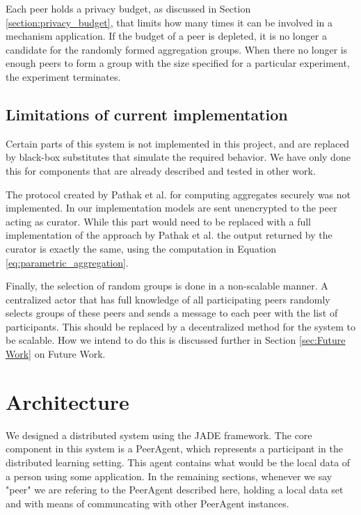 Each peer holds a privacy budget, as discussed in Section \ref{section:privacy_budget}, that limits how many times it can be involved in a mechanism application. If the budget of a peer is depleted, it is no longer a candidate for the randomly formed aggregation groups. When there no longer is enough peers to form a group with the size specified for a particular experiment, the experiment terminates.

\subsection{Limitations of current implementation}

Certain parts of this system is not implemented in this project, and are replaced by black-box substitutes that simulate the required behavior. We have only done this for components that are already described and tested in other work. 

The protocol created by Pathak et al. for computing aggregates securely was not implemented. In our implementation models are sent unencrypted to the peer acting as curator. While this part would need to be replaced with a full implementation of the approach by Pathak et al. the output returned by the curator is exactly the same, using the computation in Equation \ref{eq:parametric_aggregation}. 

Finally, the selection of random groups is done in a non-scalable manner. A centralized actor that has full knowledge of all participating peers randomly selects groups of these peers and sends a message to each peer with the list of participants. This should be replaced by a decentralized method for the system to be scalable. How we intend to do this is discussed further in Section \ref{sec:Future Work} on Future Work.


\section{Architecture}

We designed a distributed system using the JADE framework. The core component in this system is a PeerAgent, which represents a participant in the distributed learning setting. This agent contains what would be the local data of a person using some application. In the remaining sections, whenever we say "peer" we are refering to the PeerAgent described here, holding a local data set and with means of communcating with other PeerAgent instances.


